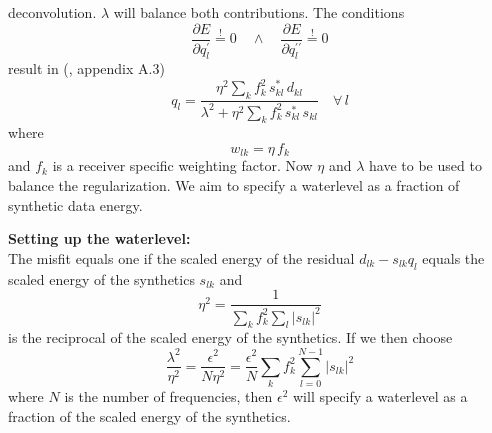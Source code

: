      deconvolution.
     $\lambda$ will balance both contributions.
     The conditions
     \begin{equation}
       \frac{\partial E}{\partial q_l^\prime}\stackrel{!}{=}0
       \quad\wedge\quad
       \frac{\partial E}{\partial q_l^{\prime\prime}}\stackrel{!}{=}0
     \end{equation}
     result in (\cite{Forbriger:01}, appendix A.3)
     \begin{equation}
       q_l=\frac{
         \eta^2\sum\limits_{k}f_k^2\,s_{kl}^\ast\,d_{kl}
       }{
         \lambda^2+\eta^2\sum\limits_{k}f_k^2\,s_{kl}^\ast\,s_{kl}
       }
       \quad\forall\, l
     \end{equation}
     where
     \begin{equation}
       w_{lk}=\eta\,f_k
     \end{equation}
     and $f_k$ is a receiver specific weighting factor.
     Now $\eta$ and $\lambda$ have to be used to balance the
     regularization.
     We aim to specify a waterlevel as a fraction of synthetic data energy.\\
\newline
      
     \textbf{Setting up the waterlevel:}\\
     The misfit equals one if the scaled energy of the residual
     $d_{lk}-s_{lk}q_l$ equals the scaled energy of the synthetics
     $s_{lk}$ and
     \begin{equation}
       \eta^2=\frac{1}{\sum\limits_k f_k^2\sum\limits_l \left|s_{lk}\right|^2}
     \end{equation}
     is the reciprocal of the scaled energy of the synthetics.
     If we then choose
     \begin{equation}
       \frac{\lambda^2}{\eta^2}=\frac{\epsilon^2}{N\eta^2}=
         \frac{\epsilon^2}{N}\sum\limits_k f_k^2\sum\limits_{l=0}^{N-1}
        \left|s_{lk}\right|^2
     \end{equation}
     where $N$ is the number of frequencies, then $\epsilon^2$
     will specify a waterlevel as a fraction of the scaled energy of the
     synthetics.\\
\newline
    

